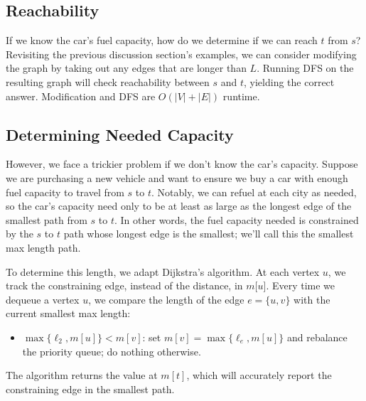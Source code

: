 \documentclass[11pt]{article}
\begin{document}
\subsection{Reachability}
If we know the car's fuel capacity, how do we determine if we can reach $t$ from $s$? Revisiting the previous discussion section's examples, we can consider modifying the graph by taking out any edges that are longer than $L$. Running DFS on the resulting graph will check reachability between $s$ and $t$, yielding the correct answer. Modification and DFS are $O(|V| + |E|)$ runtime.

\subsection{Determining Needed Capacity}
However, we face a trickier problem if we don't know the car's capacity. Suppose we are purchasing a new vehicle and want to ensure we buy a car with enough fuel capacity to travel from $s$ to $t$. Notably, we can refuel at each city as needed, so the car's capacity need only to be at least as large as the longest edge of the smallest path from $s$ to $t$. In other words, the fuel capacity needed is constrained by the $s$ to $t$ path whose longest edge is the smallest; we'll call this the smallest max length path. 

To determine this length, we adapt Dijkstra's algorithm. At each vertex $u$, we track the constraining edge, instead of the distance, in $m$[$u$]. Every time we dequeue a vertex $u$, we compare the length of the edge $e = \{u, v \}$ with the current smallest max length:
\begin{itemize}
    \item $\max\{\ell_2, m[u]\} < m[v]$: set $m[v] = \max\{\ell_e, m[u]\}$ and rebalance the priority queue; do nothing otherwise.
\end{itemize}

The algorithm returns the value at $m[t]$, which will accurately report the constraining edge in the smallest path.
\end{document}
